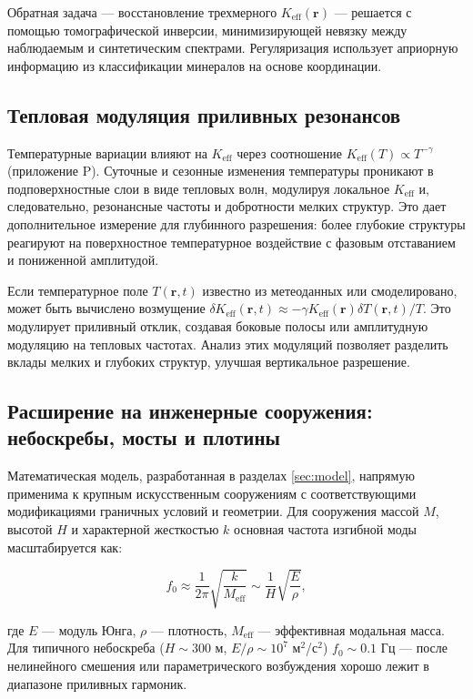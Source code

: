 \documentclass[12pt,a4paper]{article}
\theoremstyle{remark}
\newcommand{\Keff}{K_{\mathrm{eff}}}
\begin{document}
	Обратная задача — восстановление трехмерного $\Keff(\mathbf{r})$ — решается с помощью томографической инверсии, минимизирующей невязку между наблюдаемым и синтетическим спектрами. Регуляризация использует априорную информацию из классификации минералов на основе координации.
	
	\subsection{Тепловая модуляция приливных резонансов}
	\label{sec:thermal-modulation}
	
	Температурные вариации влияют на $\Keff$ через соотношение $\Keff(T) \propto T^{-\gamma}$ (приложение P). Суточные и сезонные изменения температуры проникают в подповерхностные слои в виде тепловых волн, модулируя локальное $\Keff$ и, следовательно, резонансные частоты и добротности мелких структур. Это дает дополнительное измерение для глубинного разрешения: более глубокие структуры реагируют на поверхностное температурное воздействие с фазовым отставанием и пониженной амплитудой.
	
	Если температурное поле $T(\mathbf{r},t)$ известно из метеоданных или смоделировано, может быть вычислено возмущение $\delta \Keff(\mathbf{r},t) \approx -\gamma \Keff(\mathbf{r}) \delta T(\mathbf{r},t)/T$. Это модулирует приливный отклик, создавая боковые полосы или амплитудную модуляцию на тепловых частотах. Анализ этих модуляций позволяет разделить вклады мелких и глубоких структур, улучшая вертикальное разрешение.
	
	\subsection{Расширение на инженерные сооружения: небоскребы, мосты и плотины}
	\label{sec:structures}
	
	Математическая модель, разработанная в разделах \ref{sec:model}, напрямую применима к крупным искусственным сооружениям с соответствующими модификациями граничных условий и геометрии. Для сооружения массой \(M\), высотой \(H\) и характерной жесткостью \(k\) основная частота изгибной моды масштабируется как:
	
	\begin{equation}
		f_0 \approx \frac{1}{2\pi} \sqrt{\frac{k}{M_{\mathrm{eff}}}} \sim \frac{1}{H} \sqrt{\frac{E}{\rho}},
		\label{eq:structural-frequency}
	\end{equation}
	
	где \(E\) — модуль Юнга, \(\rho\) — плотность, \(M_{\mathrm{eff}}\) — эффективная модальная масса. Для типичного небоскреба (\(H \sim 300\) м, \(E/\rho \sim 10^7\) м\(^2\)/с\(^2\)) \(f_0 \sim 0.1\) Гц — после нелинейного смешения или параметрического возбуждения хорошо лежит в диапазоне приливных гармоник.
	
\end{document}
